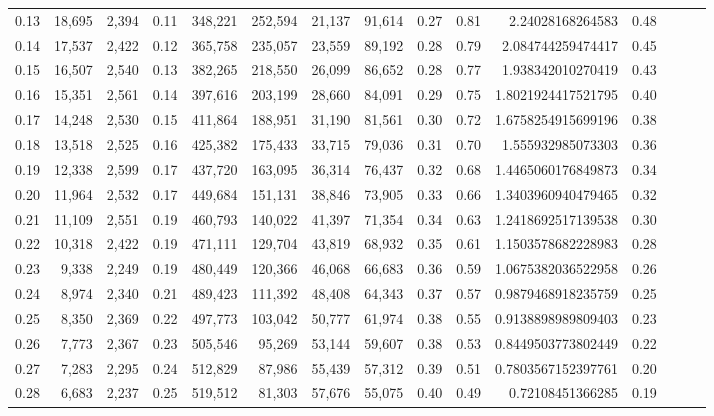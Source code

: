 \begin{tabular}{rrrrrrrrrrrrrrr}
0.13 &  18,695 &  2,394 &  0.11 &  348,221 &  252,594 &   21,137 &   91,614 &  0.27 &  0.81 &        2.24028168264583 &      0.48 \\
0.14 &  17,537 &  2,422 &  0.12 &  365,758 &  235,057 &   23,559 &   89,192 &  0.28 &  0.79 &       2.084744259474417 &      0.45 \\
0.15 &  16,507 &  2,540 &  0.13 &  382,265 &  218,550 &   26,099 &   86,652 &  0.28 &  0.77 &       1.938342010270419 &      0.43 \\
0.16 &  15,351 &  2,561 &  0.14 &  397,616 &  203,199 &   28,660 &   84,091 &  0.29 &  0.75 &      1.8021924417521795 &      0.40 \\
0.17 &  14,248 &  2,530 &  0.15 &  411,864 &  188,951 &   31,190 &   81,561 &  0.30 &  0.72 &      1.6758254915699196 &      0.38 \\
0.18 &  13,518 &  2,525 &  0.16 &  425,382 &  175,433 &   33,715 &   79,036 &  0.31 &  0.70 &       1.555932985073303 &      0.36 \\
0.19 &  12,338 &  2,599 &  0.17 &  437,720 &  163,095 &   36,314 &   76,437 &  0.32 &  0.68 &      1.4465060176849873 &      0.34 \\
0.20 &  11,964 &  2,532 &  0.17 &  449,684 &  151,131 &   38,846 &   73,905 &  0.33 &  0.66 &      1.3403960940479465 &      0.32 \\
0.21 &  11,109 &  2,551 &  0.19 &  460,793 &  140,022 &   41,397 &   71,354 &  0.34 &  0.63 &      1.2418692517139538 &      0.30 \\
0.22 &  10,318 &  2,422 &  0.19 &  471,111 &  129,704 &   43,819 &   68,932 &  0.35 &  0.61 &      1.1503578682228983 &      0.28 \\
0.23 &   9,338 &  2,249 &  0.19 &  480,449 &  120,366 &   46,068 &   66,683 &  0.36 &  0.59 &      1.0675382036522958 &      0.26 \\
0.24 &   8,974 &  2,340 &  0.21 &  489,423 &  111,392 &   48,408 &   64,343 &  0.37 &  0.57 &      0.9879468918235759 &      0.25 \\
0.25 &   8,350 &  2,369 &  0.22 &  497,773 &  103,042 &   50,777 &   61,974 &  0.38 &  0.55 &      0.9138898989809403 &      0.23 \\
0.26 &   7,773 &  2,367 &  0.23 &  505,546 &   95,269 &   53,144 &   59,607 &  0.38 &  0.53 &      0.8449503773802449 &      0.22 \\
0.27 &   7,283 &  2,295 &  0.24 &  512,829 &   87,986 &   55,439 &   57,312 &  0.39 &  0.51 &      0.7803567152397761 &      0.20 \\
0.28 &   6,683 &  2,237 &  0.25 &  519,512 &   81,303 &   57,676 &   55,075 &  0.40 &  0.49 &        0.72108451366285 &      0.19 \\

\end{tabular}
